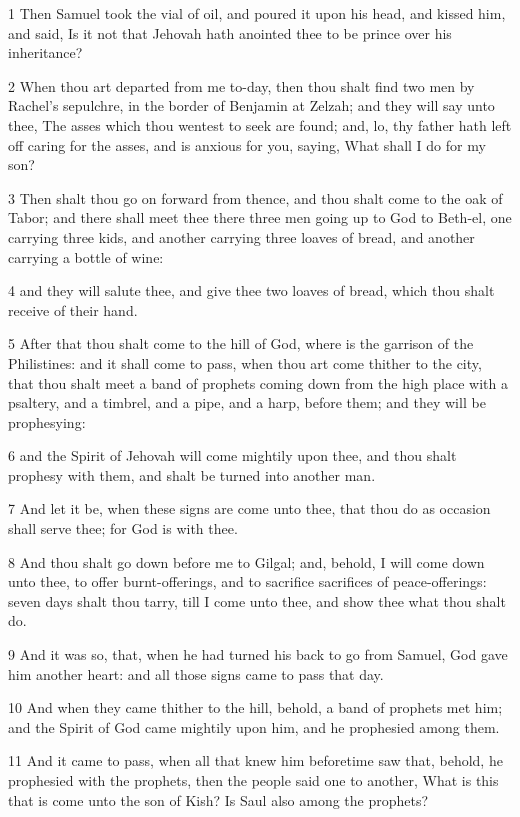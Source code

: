 \par 1 Then Samuel took the vial of oil, and poured it upon his head, and kissed him, and said, Is it not that Jehovah hath anointed thee to be prince over his inheritance?
\par 2 When thou art departed from me to-day, then thou shalt find two men by Rachel's sepulchre, in the border of Benjamin at Zelzah; and they will say unto thee, The asses which thou wentest to seek are found; and, lo, thy father hath left off caring for the asses, and is anxious for you, saying, What shall I do for my son?
\par 3 Then shalt thou go on forward from thence, and thou shalt come to the oak of Tabor; and there shall meet thee there three men going up to God to Beth-el, one carrying three kids, and another carrying three loaves of bread, and another carrying a bottle of wine:
\par 4 and they will salute thee, and give thee two loaves of bread, which thou shalt receive of their hand.
\par 5 After that thou shalt come to the hill of God, where is the garrison of the Philistines: and it shall come to pass, when thou art come thither to the city, that thou shalt meet a band of prophets coming down from the high place with a psaltery, and a timbrel, and a pipe, and a harp, before them; and they will be prophesying:
\par 6 and the Spirit of Jehovah will come mightily upon thee, and thou shalt prophesy with them, and shalt be turned into another man.
\par 7 And let it be, when these signs are come unto thee, that thou do as occasion shall serve thee; for God is with thee.
\par 8 And thou shalt go down before me to Gilgal; and, behold, I will come down unto thee, to offer burnt-offerings, and to sacrifice sacrifices of peace-offerings: seven days shalt thou tarry, till I come unto thee, and show thee what thou shalt do.
\par 9 And it was so, that, when he had turned his back to go from Samuel, God gave him another heart: and all those signs came to pass that day.
\par 10 And when they came thither to the hill, behold, a band of prophets met him; and the Spirit of God came mightily upon him, and he prophesied among them.
\par 11 And it came to pass, when all that knew him beforetime saw that, behold, he prophesied with the prophets, then the people said one to another, What is this that is come unto the son of Kish? Is Saul also among the prophets?
